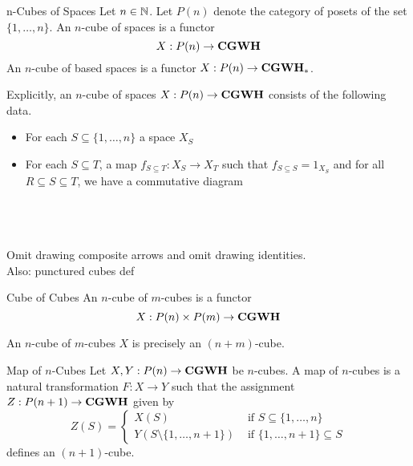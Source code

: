 \documentclass[a4paper]{article}
\begin{document}
\begin{defn}{n-Cubes of Spaces}{} Let $n\in\mathbb{N}$. Let $P(n)$ denote the category of posets of the set $\{1,\dots,n\}$. An $n$-cube of spaces is a functor $$X:P(n)\to\bold{CGWH}$$ An $n$-cube of based spaces is a functor $X:P(n)\to\bold{CGWH}_\ast$. 
\end{defn}

Explicitly, an $n$-cube of spaces $X:P(n)\to\bold{CGWH}$ consists of the following data. 
\begin{itemize}
\item For each $S\subseteq\{1,\dots,n\}$ a space $X_S$
\item For each $S\subseteq T$, a map $f_{S\subseteq T}:X_S\to X_T$ such that $f_{S\subseteq S}=1_{X_S}$ and for all $R\subseteq S\subseteq T$, we have a commutative diagram \\~\\
\\~\\
\end{itemize}

Omit drawing composite arrows and omit drawing identities. \\
Also: punctured cubes def

\begin{defn}{Cube of Cubes}{} An $n$-cube of $m$-cubes is a functor $$X:P(n)\times P(m)\to\bold{CGWH}$$
\end{defn}

\begin{lmm}{}{} An $n$-cube of $m$-cubes $X$ is precisely an $(n+m)$-cube. 
\end{lmm}

\begin{defn}{Map of $n$-Cubes}{} Let $X,Y:P(n)\to\bold{CGWH}$ be $n$-cubes. A map of $n$-cubes is a natural transformation $F:X\to Y$ such that the assignment $Z:P(n+1)\to\bold{CGWH}$ given by $$Z(S)=\begin{cases}
X(S) & \text{ if } S\subseteq\{1,\dots,n\}\\
Y(S\setminus\{1,\dots, n+1\}) & \text{ if }\{1,\dots,n+1\}\subseteq S
\end{cases}$$
defines an $(n+1)$-cube. 
\end{defn}
\end{document}
